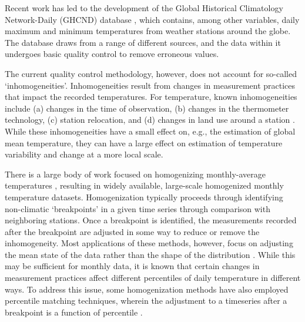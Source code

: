 \documentclass[letter]{article}
\begin{document}
Recent work has led to the development of the Global Historical Climatology Network-Daily (GHCND) database \citep{menne2012overview}, which contains, among other variables, daily maximum and minimum temperatures from weather stations around the globe. The database draws from a range of different sources, and the data within it undergoes basic quality control to remove erroneous values. 

The current quality control methodology, however, does not account for so-called `inhomogeneities'. Inhomogeneities result from changes in measurement practices that impact the recorded temperatures. For temperature, known inhomogeneities include (a) changes in the time of observation, (b) changes in the thermometer technology, (c) station relocation, and (d) changes in land use around a station \citep{menne2009us}. While these inhomogeneities have a small effect on, e.g., the estimation of global mean temperature, they can have a large effect on estimation of temperature variability and change at a more local scale.

There is a large body of work focused on homogenizing monthly-average temperatures \citep[e.g.,][]{karl1986model, easterling1996development, peterson1998homogeneity, ducre2003comparison, menne2009homogenization, vincent2012second}, resulting in widely available, large-scale homogenized monthly temperature datasets. Homogenization typically proceeds through identifying non-climatic `breakpoints' in a given time series through comparison with neighboring stations. Once a breakpoint is identified, the measurements recorded after the breakpoint are adjusted in some way to reduce or remove the inhomogeneity. Most applications of these methods, however, focus on adjusting the mean state of the data rather than the shape of the distribution \citep[see][and references therein]{della2006method}. While this may be sufficient for monthly data, it is known that certain changes in measurement practices affect different percentiles of daily temperature in different ways. To address this issue, some homogenization methods have also employed percentile matching techniques, wherein the adjustment to a timeseries after a breakpoint is a function of percentile \citep{della2006method, trewin2013daily}. 
\end{document}
